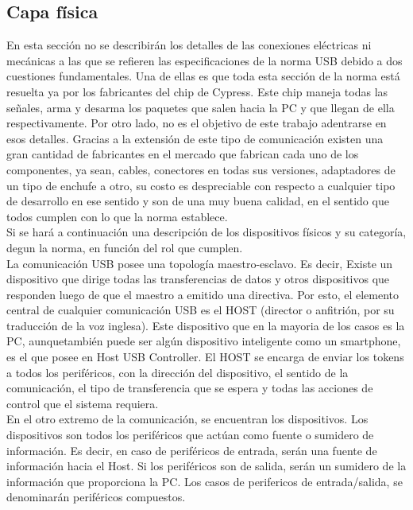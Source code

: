\subsection{Capa física}
	En esta sección no se describirán los detalles de las conexiones eléctricas ni mecánicas a las que se refieren las especificaciones de la norma USB debido a dos cuestiones fundamentales. Una de ellas es que toda esta sección de la norma está resuelta ya por los fabricantes del chip de Cypress. Este chip maneja todas las señales, arma y desarma los paquetes que salen hacia la PC y que llegan de ella respectivamente. Por otro lado, no es el objetivo de este trabajo adentrarse en esos detalles. Gracias a la extensión de este tipo de comunicación existen una gran cantidad de fabricantes en el mercado que fabrican cada uno de los componentes, ya sean, cables, conectores en todas sus versiones, adaptadores de un tipo de enchufe a otro, su costo es despreciable con respecto a cualquier tipo de desarrollo en ese sentido y son de una muy buena calidad, en el sentido que todos cumplen con lo que la norma establece.\\
	
	Si se hará a continuación una descripción de los dispositivos físicos y su categoría, degun la norma, en función del rol que cumplen.\\
	
	La comunicación USB posee una topología maestro-esclavo. Es decir, Existe un dispositivo que dirige todas las transferencias de datos y otros dispositivos que responden luego de que el maestro a emitido una directiva. Por esto, el elemento central de cualquier comunicación USB es el HOST (director o anfitrión, por su traducción de la voz inglesa). Este dispositivo que en la mayoria de los casos es la PC, aunquetambién puede ser algún dispositivo inteligente como un smartphone, es el que posee en Host USB Controller. El HOST se encarga de enviar los tokens a todos los periféricos, con la dirección del dispositivo, el sentido de la comunicación, el tipo de transferencia que se espera y todas las acciones de control que el sistema requiera.\\
	
	En el otro extremo de la comunicación, se encuentran los dispositivos. Los dispositivos son todos los periféricos que actúan como fuente o sumidero de información. Es decir, en caso de periféricos de entrada, serán una fuente de información hacia el Host. Si los periféricos son de salida, serán un sumidero de la información que proporciona la PC. Los casos de perifericos de entrada/salida, se denominarán periféricos compuestos.\\
	

